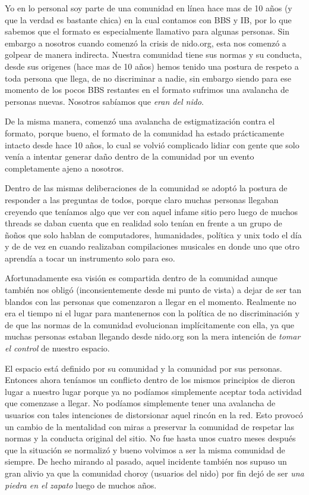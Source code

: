 \documentclass[11pt]{utalcaDoc}
\begin{document}
Yo en lo personal soy parte de una comunidad en línea hace mas de 10 años (y que la verdad es bastante chica) en la cual contamos con BBS y IB, por lo que sabemos que el formato es especialmente llamativo para algunas personas. Sin embargo a nosotros cuando comenzó la crisis de nido.org, esta nos comenzó a golpear de manera indirecta. Nuestra comunidad tiene sus normas y su conducta, desde sus origenes (hace mas de 10 años) hemos tenido una postura de respeto a toda persona que llega, de no discriminar a nadie, sin embargo siendo para ese momento de los pocos BBS restantes en el formato sufrimos una avalancha de personas nuevas. Nosotros sabíamos que \textit{eran del nido}.

De la misma manera, comenzó una avalancha de estigmatización contra el formato, porque bueno, el formato de la comunidad ha estado prácticamente intacto desde hace 10 años, lo cual se volvió complicado lidiar con gente que solo venía a intentar generar daño dentro de la comunidad por un evento completamente ajeno a nosotros.

Dentro de las mismas deliberaciones de la comunidad se adoptó la postura de responder a las preguntas de todos, porque claro muchas personas llegaban creyendo que teníamos algo que ver con aquel infame sitio pero luego de muchos threads se daban cuenta que en realidad solo tenían en frente a un grupo de ñoños que solo hablan de computadores, humanidades, política y unix todo el día y de de vez en cuando realizaban compilaciones musicales en donde uno que otro aprendía a tocar un instrumento solo para eso.

Afortunadamente esa visión es compartida dentro de la comunidad aunque también nos obligó (inconsientemente desde mi punto de vista) a dejar de ser tan blandos con las personas que comenzaron a llegar en el momento. Realmente no era el tiempo ni el lugar para mantenernos con la política de no discriminación y de que las normas de la comunidad evolucionan implícitamente con ella, ya que muchas personas estaban llegando desde nido.org son la mera intención de \textit{tomar el control} de nuestro espacio.

El espacio está definido por su comunidad y la comunidad por sus personas. Entonces ahora teníamos un conflicto dentro de los mismos principios de dieron lugar a nuestro lugar porque ya no podíamos simplemente aceptar toda actividad que comenzase a llegar. No podíamos simplemente tener una avalancha de usuarios con tales intenciones de distorsionar aquel rincón en la red. Esto provocó un cambio de la mentalidad con miras a preservar la comunidad de respetar las normas y la conducta original del sitio. No fue hasta unos cuatro meses después que la situación se normalizó y bueno volvimos a ser la misma comunidad de siempre. De hecho mirando al pasado, aquel incidente también nos supuso un gran alivio ya que la comunidad choroy (usuarios del nido) por fin dejó de ser \textit{una piedra en el zapato} luego de muchos años.
\end{document}
